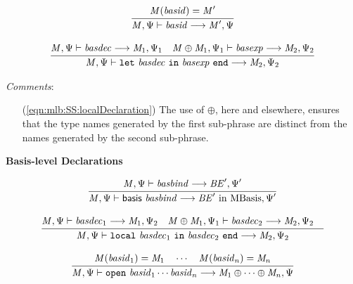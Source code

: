 \begin{equation}
{\frac{\displaystyle\strut{
\mathit{M}(\mathit{basid}) = \mathit{M}'
}}{\displaystyle\strut{
\mathit{M}, \Psi \vdash \mathit{basid} \longrightarrow \mathit{M}', \Psi
}}}
\end{equation}

\begin{equation}
\label{eqn:mlb:SS:localDeclaration}
{\frac{\displaystyle\strut{
\mathit{M}, \Psi \vdash \mathit{basdec} \longrightarrow \mathit{M}_1, \Psi_1 \quad
\mathit{M} \oplus \mathit{M}_1, \Psi_1 \vdash \mathit{basexp} \longrightarrow \mathit{M}_2, \Psi_2
}}{\displaystyle\strut{
\mathit{M}, \Psi \vdash \mathtt{let}~ \mathit{basdec} ~\mathtt{in}~ \mathit{basexp} ~\mathtt{end} \longrightarrow \mathit{M}_2, \Psi_2
}}}
\end{equation}

\begin{samepage}
\noindent
\textit{Comments}:
\begin{itemize}
\item[(\ref{eqn:mlb:SS:localDeclaration})] The use of $\oplus$, here
  and elsewhere, ensures that the type names generated by the first
  sub-phrase are distinct from the names generated by the second sub-phrase.
\end{itemize}
\end{samepage}

\vspace{2\parsep}
{\large\noindent
\textbf{Basis-level Declarations} \hfill 
{}
}\nopagebreak

\begin{equation}
{\frac{\displaystyle\strut{
\mathit{M}, \Psi  \vdash \mathit{basbind} \longrightarrow \mathit{BE}', \Psi'
}}{\displaystyle\strut{
\mathit{M}, \Psi  \vdash \mathsf{basis}~ \mathit{basbind} \longrightarrow \mathit{BE}' ~\mathrm{in}~ \mathrm{MBasis}, \Psi'
}}}
\end{equation}

\begin{equation}
{\frac{\displaystyle\strut{
\mathit{M}, \Psi  \vdash \mathit{basdec}_1 \longrightarrow \mathit{M}_1, \Psi_2 \quad
\mathit{M} \oplus \mathit{M}_1, \Psi_1  \vdash \mathit{basdec}_2 \longrightarrow \mathit{M}_2, \Psi_2 \quad
}}{\displaystyle\strut{
\mathit{M}, \Psi  \vdash \mathtt{local}~ \mathit{basdec}_1 ~\mathtt{in}~ \mathit{basdec}_2 ~\mathtt{end} \longrightarrow \mathit{M}_2, \Psi_2
}}}
\end{equation}

\begin{equation}
{\frac{\displaystyle\strut{
\mathit{M}(\mathit{basid}_1) = \mathit{M}_1 \quad \cdots \quad
\mathit{M}(\mathit{basid}_n) = \mathit{M}_n 
}}{\displaystyle\strut{
\mathit{M}, \Psi  \vdash \mathtt{open}~ \mathit{basid}_1 \cdots \mathit{basid}_n \longrightarrow \mathit{M}_1 \oplus \cdots \oplus \mathit{M}_n, \Psi
}}}
\end{equation}

